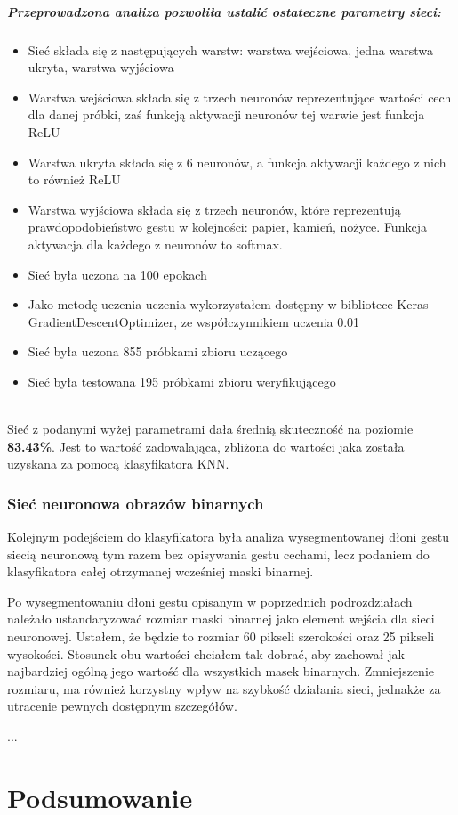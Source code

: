 \documentclass[a4paper,12pt,twoside,openany]{report}
\begin{document}
	\paragraph{Przeprowadzona analiza pozwoliła ustalić ostateczne parametry sieci:}
	\begin{itemize}
		\item Sieć składa się z następujących warstw: warstwa wejściowa, jedna warstwa ukryta, warstwa wyjściowa
		\item Warstwa wejściowa składa się z trzech neuronów reprezentujące wartości cech dla danej próbki, zaś funkcją aktywacji neuronów tej warwie jest funkcja ReLU
		\item Warstwa ukryta składa się z 6 neuronów, a funkcja aktywacji każdego z nich to również ReLU
		\item Warstwa wyjściowa składa się z trzech neuronów, które reprezentują prawdopodobieństwo gestu w kolejności: papier, kamień, nożyce. Funkcja aktywacja dla każdego z neuronów to softmax.
		\item Sieć była uczona na 100 epokach
		\item Jako metodę uczenia uczenia wykorzystałem dostępny w bibliotece Keras GradientDescentOptimizer, ze współczynnikiem uczenia 0.01
		\item Sieć była uczona 855 próbkami zbioru uczącego
		\item Sieć była testowana 195 próbkami zbioru weryfikującego
	\end{itemize}
	\mbox{}
	\\
	Sieć z podanymi wyżej parametrami dała średnią skuteczność na poziomie \textbf{83.43\%}. Jest to wartość zadowalająca, zbliżona do wartości jaka została uzyskana za pomocą klasyfikatora KNN.
\subsection{Sieć neuronowa obrazów binarnych}


Kolejnym podejściem do klasyfikatora była analiza wysegmentowanej dłoni gestu siecią neuronową tym razem bez opisywania gestu cechami, lecz podaniem do klasyfikatora całej otrzymanej wcześniej maski binarnej. 

Po wysegmentowaniu dłoni gestu opisanym w poprzednich podrozdziałach należało ustandaryzować rozmiar maski binarnej jako element wejścia dla sieci neuronowej. Ustałem, że będzie to rozmiar 60 pikseli szerokości oraz 25 pikseli wysokości. Stosunek obu wartości chciałem tak dobrać, aby zachował jak najbardziej ogólną jego wartość dla wszystkich masek binarnych. Zmniejszenie rozmiaru, ma również korzystny wpływ na szybkość działania sieci, jednakże za utracenie pewnych dostępnym szczegółów.

...

\chapter{Podsumowanie}





\appendix



\begin{thebibliography}{99}


\end{thebibliography}
\end{document}

